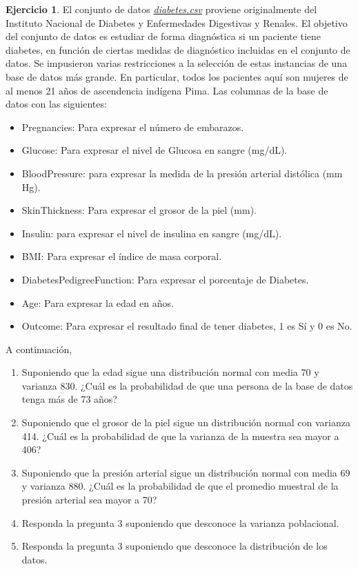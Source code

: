 \documentclass[
  11pt,
]{book}
\providecommand{\tightlist}{%
  \setlength{\itemsep}{0pt}\setlength{\parskip}{0pt}}
\theoremstyle{definition}
\theoremstyle{definition}
\theoremstyle{definition}
\newtheorem{exercise}{Ejercicio}[chapter]
\theoremstyle{definition}
\theoremstyle{remark}
\begin{document}
\begin{exercise}

El conjunto de datos \href{https://raw.githubusercontent.com/Dfranzani/Bases-de-datos-para-cursos/main/2022-2/Estad\%C3\%ADstica\%201/diabetes.csv}{\emph{diabetes.csv}} proviene originalmente del Instituto Nacional de Diabetes y Enfermedades Digestivas y Renales. El objetivo del conjunto de datos es estudiar de forma diagnóstica si un paciente tiene diabetes, en función de ciertas medidas de diagnóstico incluidas en el conjunto de datos. Se impusieron varias restricciones a la selección de estas instancias de una base de datos más grande. En particular, todos los pacientes aquí son mujeres de al menos 21 años de ascendencia indígena Pima. Las columnas de la base de datos con las siguientes:

\begin{itemize}
\tightlist
\item
  Pregnancies: Para expresar el número de embarazos.
\item
  Glucose: Para expresar el nivel de Glucosa en sangre (mg/dL).
\item
  BloodPressure: para expresar la medida de la presión arterial distólica (mm Hg).
\item
  SkinThickness: Para expresar el grosor de la piel (mm).
\item
  Insulin: para expresar el nivel de insulina en sangre (mg/dL).
\item
  BMI: Para expresar el índice de masa corporal.
\item
  DiabetesPedigreeFunction: Para expresar el porcentaje de Diabetes.
\item
  Age: Para expresar la edad en años.
\item
  Outcome: Para expresar el resultado final de tener diabetes, 1 es Sí y 0 es No.
\end{itemize}

A continuación,

\begin{enumerate}
\def\labelenumi{\arabic{enumi}.}
\tightlist
\item
  Suponiendo que la edad sigue una distribución normal con media 70 y varianza 830. ¿Cuál es la probabilidad de que una persona de la base de datos tenga más de 73 años?
\item
  Suponiendo que el grosor de la piel sigue un distribución normal con varianza 414. ¿Cuál es la probabilidad de que la varianza de la muestra sea mayor a 406?
\item
  Suponiendo que la presión arterial sigue un distribución normal con media 69 y varianza 880. ¿Cuál es la probabilidad de que el promedio muestral de la presión arterial sea mayor a 70?
\item
  Responda la pregunta 3 suponiendo que desconoce la varianza poblacional.
\item
  Responda la pregunta 3 suponiendo que desconoce la distribución de los datos.
\end{enumerate}

\end{exercise}

\backmatter

  
\end{document}
